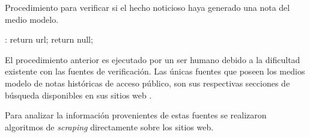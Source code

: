 \begin{algorithm}[H]
	\caption{Procedimiento para verificar si el hecho noticioso haya generado una nota del medio modelo.}
	\label{pchaveLink}
	\begin{algorithmic}[1]
		:
			\State return url;
		\Else
			\State return null;
		\EndIf
		\EndFunction
	\end{algorithmic}
\end{algorithm}	

El procedimiento anterior es ejecutado por un ser humano debido a la dificultad existente con las fuentes de verificación. Las únicas fuentes que poseen los medios modelo de notas históricas de acceso público, son sus respectivas secciones de búsqueda disponibles en sus sitios web \cite{busqueda24horas} \cite{busquedaBioBio} \cite{busquedaLaTercera}.

Para analizar la información provenientes de estas fuentes se realizaron algoritmos de \emph{scraping} directamente sobre los sitios web.